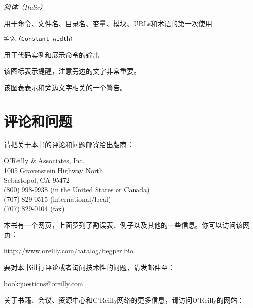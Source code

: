 \textit{斜体（Italic）}
\begin{adjustwidth}{4em}{0cm}
用于命令、文件名、目录名、变量、模块、URLs和术语的第一次使用
\end{adjustwidth}

\texttt{等宽（Constant width）}
\begin{adjustwidth}{4em}{0cm}
用于代码实例和展示命令的输出
\end{adjustwidth}

\begin{adjustwidth}{4em}{4em}
\noindent
该图标表示提醒，注意旁边的文字非常重要。
\end{adjustwidth}

\vspace*{\baselineskip}

\begin{adjustwidth}{4em}{4em}
\noindent
该图表表示和旁边文字相关的一个警告。
\end{adjustwidth}

\section*{评论和问题}
请把关于本书的评论和问题邮寄给出版商：

\begin{adjustwidth}{4em}{0cm}
O'Reilly \& Associates, Inc.\\
1005 Gravenstein Highway North\\
Sebastopol, CA 95472\\
(800) 998-9938 (in the United States or Canada)\\
(707) 829-0515 (international/local)\\
(707) 829-0104 (fax)
\end{adjustwidth}

本书有一个网页，上面罗列了勘误表、例子以及其他的一些信息。你可以访问该网页：

\href{http://www.oreilly.com/catalog/begperlbio}{http://www.oreilly.com/catalog/begperlbio}

要对本书进行评论或者询问技术性的问题，请发邮件至：

\href{bookquestions@oreilly.com}{bookquestions@oreilly.com}

关于书籍、会议、资源中心和O'Reilly网络的更多信息，请访问O'Reilly的网站：

